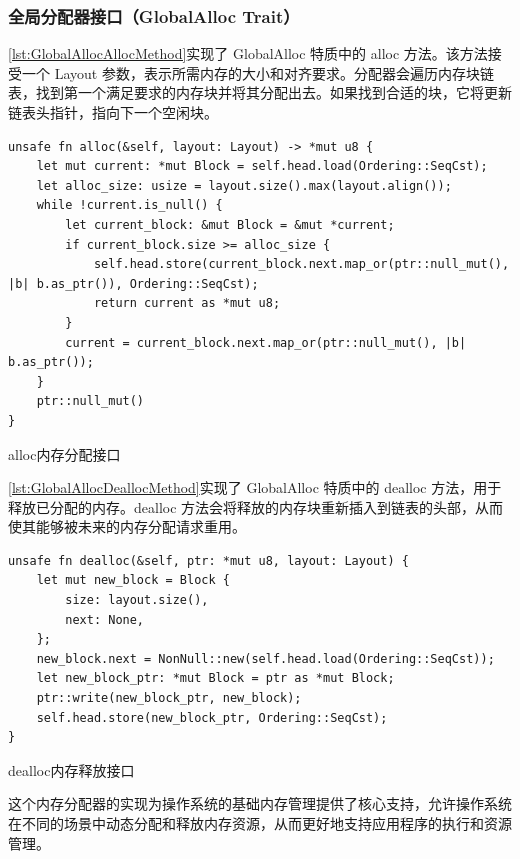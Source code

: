 \subsubsection{全局分配器接口（GlobalAlloc Trait）}

\cref{lst:GlobalAllocAllocMethod}实现了 GlobalAlloc 特质中的 alloc 方法。该方法接受一个 Layout 参数，表示所需内存的大小和对齐要求。分配器会遍历内存块链表，找到第一个满足要求的内存块并将其分配出去。如果找到合适的块，它将更新链表头指针，指向下一个空闲块。

\begin{listing}[htbp]
    \begin{verbatim}
unsafe fn alloc(&self, layout: Layout) -> *mut u8 {
    let mut current: *mut Block = self.head.load(Ordering::SeqCst);
    let alloc_size: usize = layout.size().max(layout.align());
    while !current.is_null() {
        let current_block: &mut Block = &mut *current;
        if current_block.size >= alloc_size {
            self.head.store(current_block.next.map_or(ptr::null_mut(), |b| b.as_ptr()), Ordering::SeqCst);
            return current as *mut u8;
        }
        current = current_block.next.map_or(ptr::null_mut(), |b| b.as_ptr());
    }
    ptr::null_mut()
}
    \end{verbatim}
    \caption{alloc内存分配接口}\label{lst:GlobalAllocAllocMethod}
\end{listing}

\cref{lst:GlobalAllocDeallocMethod}实现了 GlobalAlloc 特质中的 dealloc 方法，用于释放已分配的内存。dealloc 方法会将释放的内存块重新插入到链表的头部，从而使其能够被未来的内存分配请求重用。

\begin{listing}[htbp]
    \begin{verbatim}
unsafe fn dealloc(&self, ptr: *mut u8, layout: Layout) {
    let mut new_block = Block {
        size: layout.size(),
        next: None,
    };
    new_block.next = NonNull::new(self.head.load(Ordering::SeqCst));
    let new_block_ptr: *mut Block = ptr as *mut Block;
    ptr::write(new_block_ptr, new_block);
    self.head.store(new_block_ptr, Ordering::SeqCst);
}
    \end{verbatim}
    \caption{dealloc内存释放接口}\label{lst:GlobalAllocDeallocMethod}
\end{listing}

这个内存分配器的实现为操作系统的基础内存管理提供了核心支持，允许操作系统在不同的场景中动态分配和释放内存资源，从而更好地支持应用程序的执行和资源管理。

